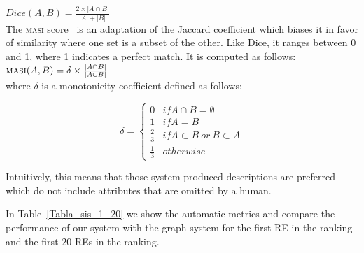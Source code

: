 $Dice(A,B) = \frac{2\times|A \cap B|}{|A|+|B|}$\\


The \textsc{masi} score \cite{Passonneau06measuringagreement}~is an adaptation of the Jaccard coefficient
which biases it in favor of similarity where one set
is a subset of the other. Like Dice, it ranges between
0 and 1, where 1 indicates a perfect match. It is computed as follows:\\


$\textsc{masi}(A,B) = \delta \times \frac{|A \cap B|}{|A \cup B|}$ \\


where $\delta$ is a monotonicity coefficient defined as follows:


 \begin{equation}
     \delta  = \left\{
	       \begin{array}{ll}
		 0      & if A \cap B = \emptyset \\
		 1 & if A = B  \\
		 \frac{2}{3}     & if A \subset B ~or~ B \subset A\\
		 \frac{1}{3}     & otherwise
	       \end{array}
	     \right.
 \end{equation}


Intuitively, this
means that those system-produced descriptions are
preferred which do not include attributes that are
omitted by a human.  

In Table~\ref{Tabla_sis_1_20} we show the automatic metrics and compare the performance of our system  with the graph system for the first RE in the ranking and the first 20 REs in the ranking. 

